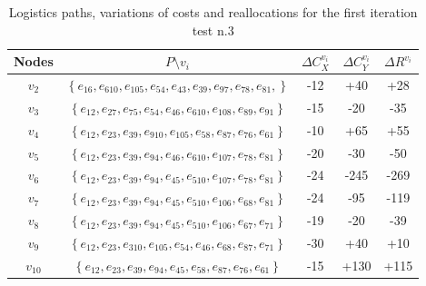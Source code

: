 \begin{table}
    \centering
    \begin{tabular}{|c|c|c|c|c|}
        \hline
        \textbf{Nodes} & \textbf{$P \setminus v_i$} & \textbf{$\Delta C_X^{v_i}$} & \textbf{$\Delta C_Y^{v_i}$} & \textbf{$\Delta R^{v_i}$} \\
        \hline
        $v_2$ & $\left\{e_{16},  e_{610}, e_{105}, e_{54}, e_{43}, e_{39}, e_{97}, e_{78}, e_{81}, \right\}$ & -12 & +40 & +28 \\
        \hline
        $v_3$ & $\left\{e_{12},  e_{27},  e_{75},  e_{54},  e_{46},  e_{610},  e_{108},  e_{89},  e_{91}  \right\}$ & -15 & -20 & -35 \\
        \hline
        $v_4$ & $\left\{e_{12},  e_{23},  e_{39},  e_{910},  e_{105},  e_{58},  e_{87},  e_{76},  e_{61}  \right\}$ & -10 & +65 & +55 \\
        \hline
        $v_5$ & $\left\{ e_{12},  e_{23},  e_{39},  e_{94},  e_{46},  e_{610},  e_{107},  e_{78},  e_{81}  \right\}$ & -20 & -30 & -50 \\
        \hline
        $v_6$ & $\left\{ e_{12},  e_{23},  e_{39},  e_{94},  e_{45},  e_{510},  e_{107},  e_{78},  e_{81}  \right\}$ & -24 & -245 & -269 \\
        \hline
        $v_7$ & $\left\{ e_{12},  e_{23},  e_{39},  e_{94},  e_{45},  e_{510},  e_{106},  e_{68},  e_{81}  \right\}$ & -24 & -95 & -119 \\
        \hline
        $v_8$ & $\left\{e_{12},  e_{23},  e_{39},  e_{94},  e_{45},  e_{510},  e_{106},  e_{67},  e_{71}   \right\}$ & -19 & -20 & -39 \\
        \hline
        $v_9$ & $\left\{e_{12},  e_{23},  e_{310},  e_{105},  e_{54},  e_{46},  e_{68},  e_{87},  e_{71}   \right\}$ & -30 & +40 & +10 \\
        \hline
        $v_10$ & $\left\{ e_{12},  e_{23},  e_{39},  e_{94},  e_{45},  e_{58},  e_{87},  e_{76},  e_{61}  \right\}$ & -15 & +130 & +115 \\
        \hline
    \end{tabular}

    \caption{Logistics paths, variations of costs and reallocations for the first iteration test n.3}
    \label{tab:reallocation-plan-first-it-test3}
\end{table}

